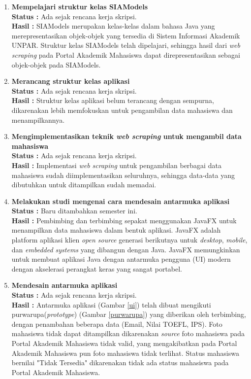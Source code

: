 \documentclass[a4paper,twoside]{article}
\begin{document}
\begin{enumerate}
        \item \textbf{Mempelajari struktur kelas SIAModels}\\
		{\bf Status :} Ada sejak rencana kerja skripsi.\\
		{\bf Hasil :} SIAModels merupakan kelas-kelas dalam bahasa Java yang merepresentasikan objek-objek yang tersedia di Sistem Informasi Akademik UNPAR.
		Struktur kelas SIAModels telah dipelajari, sehingga hasil dari \textit{web scraping} pada Portal Akademik Mahasiswa dapat direpresentasikan sebagai objek-objek pada SIAModels.
		
		
		\item \textbf{Merancang struktur kelas aplikasi}\\
		{\bf Status :} Ada sejak rencana kerja skripsi.\\
		{\bf Hasil :} Struktur kelas aplikasi belum terancang dengan sempurna, dikarenakan lebih memfokuskan untuk pengambilan data mahasiswa dan menampilkannya.
		
		
		\item \textbf{Mengimplementasikan teknik \textit{web scraping} untuk mengambil data mahasiswa}\\
		{\bf Status :} Ada sejak rencana kerja skripsi.\\
		{\bf Hasil :} Implementasi \textit{web scraping} untuk pengambilan berbagai data mahasiswa sudah diimplementasikan seluruhnya, sehingga data-data yang dibutuhkan untuk ditampilkan sudah memadai.
		
		\item \textbf{Melakukan studi mengenai cara mendesain antarmuka aplikasi}\\
		{\bf Status :} Baru ditambahkan semester ini.\\
		{\bf Hasil :} Pembimbing dan terbimbing sepakat menggunakan JavaFX untuk menampilkan data mahasiswa dalam bentuk aplikasi. JavaFX adalah platform aplikasi klien \textit{open source} generasi berikutnya untuk \textit{desktop}, \textit{mobile}, dan \textit{embedded systems} yang dibangun dengan Java. JavaFX memungkinkan untuk membuat aplikasi Java dengan antarmuka pengguna (UI) modern dengan akselerasi perangkat keras yang sangat portabel.
		
		\item \textbf{Mendesain antarmuka aplikasi}\\
		{\bf Status :} Ada sejak rencana kerja skripsi.\\
		{\bf Hasil :} Antarmuka aplikasi (Gambar \ref{ui}) telah dibuat mengikuti purwarupa(\textit{prototype}) (Gambar \ref{purwarupa}) yang diberikan oleh terbimbing, dengan penambahan beberapa data (Email, Nilai TOEFL, IPS). Foto mahasiswa tidak dapat ditampilkan dikarenakan \textit{source} foto mahasiswa pada Portal Akademik Mahasiswa tidak valid, yang mengakibatkan pada Portal Akademik Mahasiswa pun foto mahasiswa tidak terlihat. Status mahasiswa bernilai "Tidak Tersedia" dikarenakan tidak ada status mahasiswa pada Portal Akademik Mahasiswa.
		

\end{enumerate}
\end{document}
